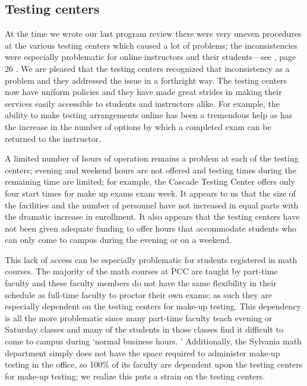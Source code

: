 \subsection{Testing centers}
At the time we wrote our last program review there were very uneven procedures at the various testing centers which caused a lot of problems; the inconsistencies were especially problematic for online instructors and their students---see \cite{mathprogramreview2003}, page 26 .
We are pleased that the testing centers recognized that inconsistency as a problem and they addressed the issue in a forthright way.
The testing centers now have uniform policies and they have made great strides in making their services easily accessible to students and instructors alike.
For example, the ability to make testing arrangements online has been a tremendous help as has the increase in the number of options by which a completed exam can be returned to the instructor.

A limited number of hours of operation remains a problem at each of the testing centers;   evening and weekend hours are not offered and testing times during the remaining time are limited; for example, the Cascade Testing Center offers only four start times for make up exams exam week.
It appears to us that the size of  the facilities and the number of personnel  have not increased in equal parts with the dramatic increase in enrollment.
It also appears that the testing centers have not been given adequate funding to offer hours that accommodate students who can only come to campus during the evening or on a weekend.

This lack of access can be especially problematic for students registered in math courses.
The majority of the math courses at PCC are taught by part-time faculty and these faculty members do not have the same flexibility in their schedule as full-time faculty to proctor their own exams; as such they are especially dependent on the testing centers for make-up testing.
This dependency is all the more problematic since many part-time faculty teach evening or Saturday classes and many of the students in those classes find it difficult to come to campus during `normal business hours.
' Additionally, the
Sylvania math department simply does not have the space required to
administer make-up testing in the office, so 100\% of its faculty are dependent
upon the testing centers for make-up testing;   we realize this puts a strain
on the testing centers.


